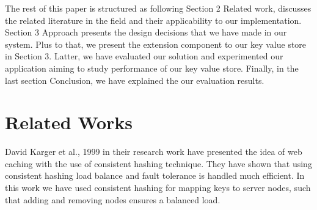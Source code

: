 \documentclass{sig-alternate}
\begin{document}
The rest of this paper is structured as following Section 2 Related work, discusses the related literature in the field and their applicability to our implementation. Section 3 Approach presents the design decisions that we have made in our system. Plus to that, we present the extension component to our key value store in Section 3. Latter, we have evaluated our solution and experimented our application aiming to study performance of our key value store.  Finally, in the last section Conclusion, we have explained the our evaluation results.

%
%
\section{Related Works}
David Karger et al., 1999 \cite{consistentHashing} in their research work have presented the idea of web caching with the use of consistent hashing technique. They have shown that using consistent hashing load  balance and fault tolerance is handled much efficient. 
In this work we  have used consistent hashing for mapping keys to server nodes, such that adding and removing nodes ensures a balanced load.
\end{document}
